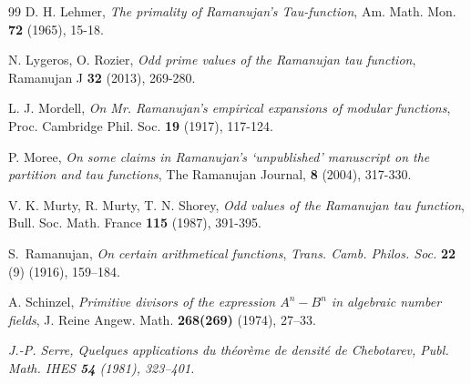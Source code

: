 \documentclass[12pt]{amsart}
\numberwithin{equation}{section}
\begin{document}
\begin{thebibliography}{99}
 D. H. Lehmer, \emph{The primality of Ramanujan’s Tau-function}, Am. Math. Mon. \textbf{72} (1965), 15-18.

 N. Lygeros, O. Rozier, \emph{Odd prime values of the Ramanujan tau function}, Ramanujan J \textbf{32} (2013), 269-280.

 L. J. Mordell, \emph{On Mr. Ramanujan's empirical expansions of modular functions},
Proc. Cambridge Phil. Soc. \textbf{19} (1917), 117-124.

 P. Moree, \emph{On some claims in Ramanujan’s ‘unpublished’ manuscript on the partition and tau functions}, The Ramanujan Journal, \textbf{8} (2004), 317-330.

 V. K. Murty, R. Murty, T. N. Shorey, \emph{Odd values of the Ramanujan tau function},
Bull. Soc. Math. France \textbf{115} (1987), 391-395.

 S.~Ramanujan, \emph{On certain arithmetical functions}, 
\textit{Trans. Camb. Philos. Soc.} \textbf{22} (9) (1916), 159--184.


 A. Schinzel, \emph{Primitive divisors of the expression $A^n-B^n$ in algebraic number fields}, J. Reine Angew. Math. \textbf{268(269)} (1974), 27–33.

 \emph{J.-P. Serre, Quelques applications du th\'eor\`eme
de densit\'e de Chebotarev, Publ. Math. IHES \textbf{54} (1981), 323--401.}

\end{thebibliography}
\end{document}

